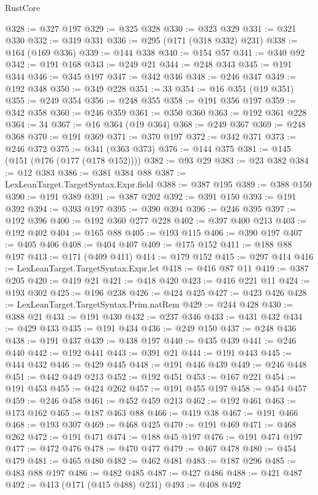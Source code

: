 \begin{lexlean}{RustCore}
\begin{coremodule}
@328 := @327 @197
@329 := @325 @328
@330 := @323 @329
@331 := @321 @330
@332 := @319 @331
@336 := @295 (@171 (@318 @332) @231)
@338 := @164 (@169 @336)
@339 := @144 @338
@340 := @154 @57
@341 := @340 @92
@342 := @191 @168
@343 := @249 @21
@344 := @248 @343
@345 := @191 @344
@346 := @345 @197
@347 := @342 @346
@348 := @246 @347
@349 := @192 @348
@350 := @349 @228
@351 := 33
@354 := @16 @351 (@19 @351)
@355 := @249 @354
@356 := @248 @355
@358 := @191 @356 @197
@359 := @342 @358
@360 := @246 @359
@361 := @350 @360
@363 := @192 @361 @228
@364 := 34
@367 := @16 @364 (@19 @364)
@368 := @249 @367
@369 := @248 @368
@370 := @191 @369
@371 := @370 @197
@372 := @342 @371
@373 := @246 @372
@375 := @341 (@363 @373)
@376 := @144 @375
@381 := @145 (@151 (@176 (@177 (@178 @152))))
@382 := @93 @29
@383 := @23 @382
@384 := @12 @383
@386 := @381 @384 @88
@387 := LexLeanTarget.TargetSyntax.Expr.field
@388 := @387 @195
@389 := @388 @150
@390 := @191 @389
@391 := @387 @202
@392 := @391 @150
@393 := @191 @392
@394 := @393 @197
@395 := @390 @394
@396 := @246 @395
@397 := @192 @396
@400 := @192 @360 @277 @228
@402 := @397 @400 @213
@403 := @192 @402
@404 := @165 @88
@405 := @193 @115
@406 := @390 @197
@407 := @405 @406
@408 := @404 @407
@409 := @175 @152
@411 := @188 @88 @197
@413 := @171 (@409 @411)
@414 := @179 @152
@415 := @297 @414
@416 := LexLeanTarget.TargetSyntax.Expr.let
@418 := @416 @87 @11
@419 := @387 @205
@420 := @419 @21
@421 := @418 @420
@423 := @416 @221 @11
@424 := @193 @302
@425 := @196 @238
@426 := @424 @425
@427 := @423 @426
@428 := LexLeanTarget.TargetSyntax.Prim.natRem
@429 := @244 @428
@430 := @388 @21
@431 := @191 @430
@432 := @237 @346
@433 := @431 @432
@434 := @429 @433
@435 := @191 @434
@436 := @249 @150
@437 := @248 @436
@438 := @191 @437
@439 := @438 @197
@440 := @435 @439
@441 := @246 @440
@442 := @192 @441
@443 := @391 @21
@444 := @191 @443
@445 := @444 @432
@446 := @429 @445
@448 := @191 @446 @439
@449 := @246 @448
@451 := @442 @449 @213
@452 := @192 @451
@453 := @167 @221
@454 := @191 @453
@455 := @424 @262
@457 := @191 @455 @197
@458 := @454 @457
@459 := @246 @458
@461 := @452 @459 @213
@462 := @192 @461
@463 := @173 @162
@465 := @187 @463 @88
@466 := @419 @38
@467 := @191 @466
@468 := @193 @307
@469 := @468 @425
@470 := @191 @469
@471 := @468 @262
@472 := @191 @471
@474 := @188 @45 @197
@476 := @191 @474 @197
@477 := @472 @476
@478 := @470 @477
@479 := @467 @478
@480 := @454 @479
@481 := @465 @480
@482 := @462 @481
@483 := @187 @296
@485 := @483 @88 @197
@486 := @482 @485
@487 := @427 @486
@488 := @421 @487
@492 := @413 (@171 (@415 @488) @231)
@493 := @408 @492

\end{coremodule}
\end{lexlean}
